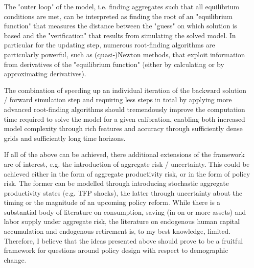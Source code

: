 The "outer loop" of the model, i.e. finding aggregates such that all equilibrium conditions are met, can be interpreted as finding the root of an "equilibrium function" that measures the distance between the "guess" on which solution is based and the "verification" that results from simulating the solved model. In particular for the updating step, numerous root-finding algorithms are particularly powerful, such as (quasi-)Newton methods, that exploit information from derivatives of the "equilibrium function" (either by calculating or by approximating derivatives).

The combination of speeding up an individual iteration of the backward solution / forward simulation step and requiring less steps in total by applying more advanced root-finding algorithms should tremendously improve the computation time required to solve the model for a given calibration, enabling both increased model complexity through rich features and accuracy through sufficiently dense grids and sufficiently long time horizons.

If all of the above can be achieved, there additional extensions of the framework are of interest, e.g. the introduction of aggregate risk / uncertainty. This could be achieved either in the form of aggregate productivity risk, or in the form of policy risk. The former can be modelled through introducing stochastic aggregate productivity states (e.g. TFP shocks), the latter through uncertainty about the timing or the magnitude of an upcoming policy reform. While there is a substantial body of literature on consumption, saving (in on or more assets) and labor supply under aggregate risk, the literature on endogenous human capital accumulation and endogenous retirement is, to my best knowledge, limited. Therefore, I believe that the ideas presented above should prove to be a fruitful framework for questions around policy design with respect to demographic change.